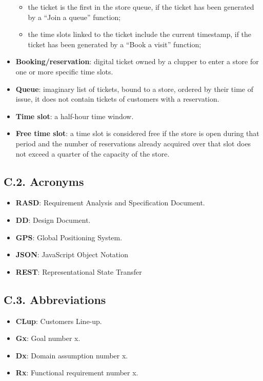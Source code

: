 \begin{itemize}
  \begin{itemize}
  \tightlist
  \item
    the ticket is the first in the store queue, if the ticket has been generated by a ``Join a queue'' function;
  \item
    the time slots linked to the ticket include the current timestamp, if the ticket has been generated by a ``Book a visit'' function;
  \end{itemize}
\item
  \textbf{Booking/reservation}: digital ticket owned by a clupper to enter a store for one or more specific time slots.
\item
  \textbf{Queue}: imaginary list of tickets, bound to a store, ordered by their time of issue, it does not contain tickets of customers with a reservation.
\item
  \textbf{Time slot}: a half-hour time window.
\item
  \textbf{Free time slot}: a time slot is considered free if the store is open during that period and the number of reservations already acquired over that slot does not exceed a quarter of the capacity of the store.
\end{itemize}

\subsection{C.2. Acronyms}

\begin{itemize}
\item
  \textbf{RASD}: Requirement Analysis and Specification Document.
\item
  \textbf{DD}: Design Document.
\item
  \textbf{GPS}: Global Positioning System.
\item
  \textbf{JSON}: JavaScript Object Notation
\item
  \textbf{REST}: Representational State Transfer
\end{itemize}

\subsection{C.3. Abbreviations}

\begin{itemize}
\item
  \textbf{CLup}: Customers Line-up.
\item
  \textbf{Gx}: Goal number x.
\item
  \textbf{Dx}: Domain assumption number x.
\item
  \textbf{Rx}: Functional requirement number x.
\end{itemize}

